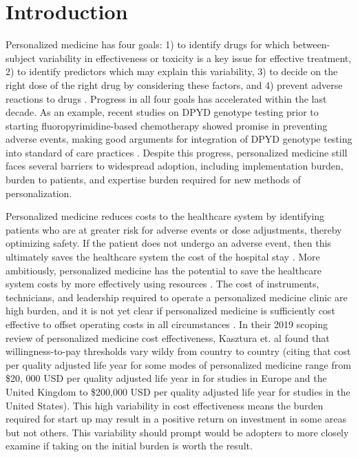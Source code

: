 \section{Introduction}

Personalized medicine has four goals: 1) to identify drugs for which between-subject variability in effectiveness or toxicity is a key issue for effective treatment, 2) to identify predictors which may explain this variability, 3) to decide on the right dose of the right drug by considering these factors, and 4) prevent adverse reactions to drugs \cite{morse2015personalized}.  Progress in all four goals has accelerated within the last decade. As an example, recent studies on DPYD genotype testing prior to starting fluoropyrimidine-based chemotherapy showed promise in preventing adverse events, making good arguments for integration of DPYD genotype testing into standard of care practices \cite{wigle2019prospective}. Despite this progress, personalized medicine still faces several barriers to widespread adoption, including implementation burden, burden to patients, and expertise burden required for new methods of personalization.


Personalized medicine reduces costs to the healthcare system by identifying patients who are at greater risk for adverse events or dose adjustments, thereby optimizing safety.  If the patient does not undergo an adverse event, then this ultimately saves the healthcare system the cost of the hospital stay \cite{looff2016economic}.  More ambitiously, personalized medicine has the potential to save the healthcare system costs by more effectively using resources \cite{shabaruddin2015economic}. The cost of instruments, technicians, and leadership required to operate a personalized medicine clinic are high burden, and it is not yet clear if personalized medicine is sufficiently cost effective to offset operating costs in all circumstances \cite{kasztura2019cost}.  In their 2019 scoping review of personalized medicine cost effectiveness, Kasztura et. al \cite{kasztura2019cost} found that willingness-to-pay thresholds vary wildy from country to country (citing that cost per quality adjusted life year for some modes of personalized medicine range from \$20, 000 USD per quality adjusted life year in for studies in Europe and the United Kingdom to \$200,000 USD per quality adjusted life year for studies in the United States).  This high variability in cost effectiveness means the burden required for start up may result in a positive return on investment in some areas but not others. This variability should prompt would be adopters to more closely examine if taking on the initial burden is worth the result.


